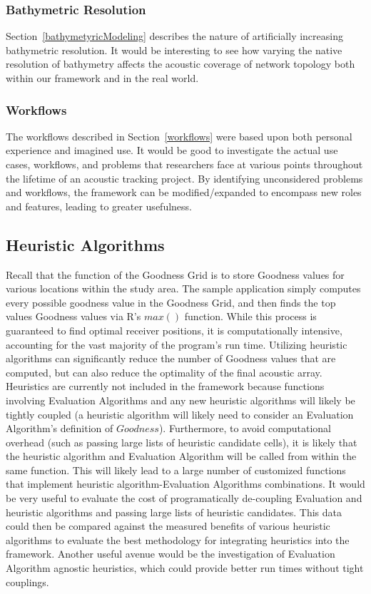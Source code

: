 \subsubsection{Bathymetric Resolution}
Section~\ref{bathymetyricModeling} describes the nature of artificially increasing bathymetric resolution.  It would be interesting to see how varying the native resolution of bathymetry affects the acoustic coverage of network topology both within our framework and in the real world.

\subsubsection{Workflows}
The workflows described in Section~\ref{workflows} were based upon both personal experience and imagined use.  It would be good to investigate the actual use cases, workflows, and problems that researchers face at various points throughout the lifetime of an acoustic tracking project.  By identifying unconsidered problems and workflows, the framework can be modified/expanded to encompass new roles and features, leading to greater usefulness.

\subsection{Heuristic Algorithms}
Recall that the function of the Goodness Grid is to store Goodness values for various locations within the study area.  The sample application simply computes every possible goodness value in the Goodness Grid, and then finds the top values Goodness values via R's $max()$ function.  While this process is guaranteed to find optimal receiver positions, it is computationally intensive, accounting for the vast majority of the program's run time.  Utilizing heuristic algorithms can significantly reduce the number of Goodness values that are computed, but can also reduce the optimality of the final acoustic array.  Heuristics are currently not included in the framework because functions involving Evaluation Algorithms and any new heuristic algorithms will likely be tightly coupled (a heuristic algorithm will likely need to consider an Evaluation Algorithm's definition of $Goodness$).  Furthermore, to avoid computational overhead (such as passing large lists of heuristic candidate cells), it is likely that the heuristic algorithm and Evaluation Algorithm will be called from within the same function.  This will likely lead to a large number of customized functions that implement heuristic algorithm-Evaluation Algorithms combinations.  It would be very useful to evaluate the cost of programatically de-coupling Evaluation and heuristic algorithms and passing large lists of heuristic candidates.  This data could then be compared against the measured benefits of various heuristic algorithms to evaluate the best methodology for integrating heuristics into the framework.  Another useful avenue would be the investigation of Evaluation Algorithm agnostic heuristics, which could provide better run times without tight couplings.

